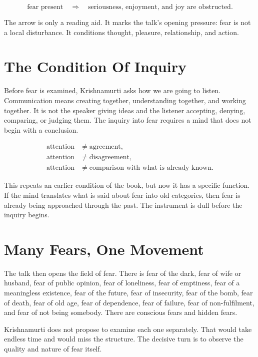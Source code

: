 \documentclass[11pt,oneside]{book}
\begin{document}
\begin{equation}
\text{fear present}
\quad \Longrightarrow \quad
\text{seriousness, enjoyment, and joy are obstructed}.
\end{equation}

The arrow is only a reading aid. It marks the talk's opening pressure: fear is not a local disturbance. It conditions thought, pleasure, relationship, and action.

\section{The Condition Of Inquiry}

Before fear is examined, Krishnamurti asks how we are going to listen. Communication means creating together, understanding together, and working together. It is not the speaker giving ideas and the listener accepting, denying, comparing, or judging them. The inquiry into fear requires a mind that does not begin with a conclusion.

\begin{align}
\text{attention} &\neq \text{agreement},\\
\text{attention} &\neq \text{disagreement},\\
\text{attention} &\neq \text{comparison with what is already known}.
\end{align}

This repeats an earlier condition of the book, but now it has a specific function. If the mind translates what is said about fear into old categories, then fear is already being approached through the past. The instrument is dull before the inquiry begins.

\section{Many Fears, One Movement}

The talk then opens the field of fear. There is fear of the dark, fear of wife or husband, fear of public opinion, fear of loneliness, fear of emptiness, fear of a meaningless existence, fear of the future, fear of insecurity, fear of the bomb, fear of death, fear of old age, fear of dependence, fear of failure, fear of non-fulfilment, and fear of not being somebody. There are conscious fears and hidden fears.

Krishnamurti does not propose to examine each one separately. That would take endless time and would miss the structure. The decisive turn is to observe the quality and nature of fear itself.
\end{document}
